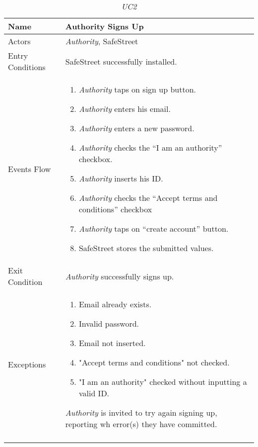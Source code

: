 \documentclass[../../../RASD.tex]{subfiles}
\begin{document}
    \begin{center}
        \begin{longtable}{| p{.35\linewidth} | p{.65\linewidth} |}

            \hline
            \textbf{Name} & \textbf{Authority Signs Up}\\ \hline
            Actors & \textit{Authority}, SafeStreet\\ \hline
            Entry Conditions & SafeStreet successfully installed.\\ \hline
            Events Flow &
            \begin{enumerate}
                \item \textit{Authority} taps on sign up button.
                \item \textit{Authority} enters his email.
                \item \textit{Authority} enters a new password.
                \item \textit{Authority} checks the “I am an authority” checkbox.
                \item \textit{Authority} inserts his ID.
                \item \textit{Authority} checks the “Accept terms and conditions” checkbox
                \item \textit{Authority} taps on “create account” button.
                \item SafeStreet stores the submitted values.
            \end{enumerate}
            \\ \hline
            Exit Condition & \textit{Authority} successfully signs up.\\ \hline
            Exceptions &
            \begin{enumerate}
                \item Email already exists.
                \item Invalid password.
                \item Email not inserted.
                \item "Accept terms and conditions" not checked.
                \item "I am an authority" checked without inputting a valid ID.
            \end{enumerate}
            \textit{Authority} is invited to try again signing up, reporting wh error(s) they have committed. \\
            \hline
            \caption{\textit{UC2}}
        \end{longtable}
    \end{center}
\end{document}
